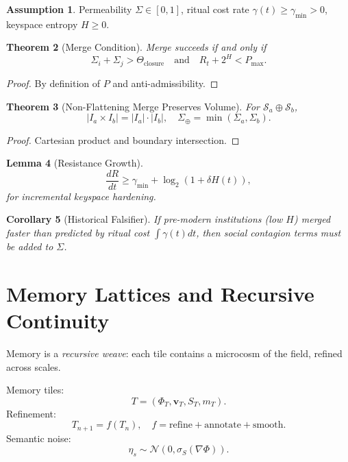 \documentclass[11pt]{article}
\newtheorem{theorem}{Theorem}[section]
\newtheorem{lemma}[theorem]{Lemma}
\newtheorem{corollary}[theorem]{Corollary}
\theoremstyle{definition}
\newtheorem{assumption}[theorem]{Assumption}
\theoremstyle{remark}
\newcommand{\vect}[1]{\bm{#1}}
\begin{document}
\begin{assumption}
\label{ass:spherepop}
Permeability $\Sigma \in [0,1]$, ritual cost rate $\gamma(t) \ge \gamma_{\min} > 0$, keyspace entropy $H \ge 0$.
\end{assumption}

\begin{theorem}[Merge Condition]
Merge succeeds if and only if
\[
\Sigma_i + \Sigma_j > \Theta_{\mathrm{closure}} \quad \text{and} \quad R_t + 2^H < P_{\max}.
\]
\end{theorem}

\begin{proof}
By definition of $P$ and anti-admissibility.
\end{proof}

\begin{theorem}[Non-Flattening Merge Preserves Volume]
For $\mathcal{S}_a \oplus \mathcal{S}_b$,
\[
|I_a \times I_b| = |I_a| \cdot |I_b|, \quad \Sigma_{\oplus} = \min(\Sigma_a,\Sigma_b).
\]
\end{theorem}

\begin{proof}
Cartesian product and boundary intersection.
\end{proof}

\begin{lemma}[Resistance Growth]
\[
\frac{dR}{dt} \ge \gamma_{\min} + \log_2(1 + \delta H(t)),
\]
for incremental keyspace hardening.
\end{lemma}

\begin{corollary}[Historical Falsifier]
If pre-modern institutions (low $H$) merged faster than predicted by ritual cost $\int \gamma(t)dt$, then social contagion terms must be added to $\Sigma$.
\end{corollary}

\section{Memory Lattices and Recursive Continuity}
Memory is a \emph{recursive weave}: each tile contains a microcosm of the field, refined across scales.

Memory tiles:
\begin{equation}
\boxed{T=(\Phi_T,\vect{v}_T,S_T,m_T).}
\end{equation}
Refinement:
\begin{equation}
\boxed{T_{n+1}=f(T_n),\quad f=\mathrm{refine}+\mathrm{annotate}+\mathrm{smooth}.}
\end{equation}
Semantic noise:
\begin{equation}
\boxed{\eta_s\sim\mathcal{N}(0,\sigma_S(\nabla\Phi)).}
\end{equation}
\end{document}
